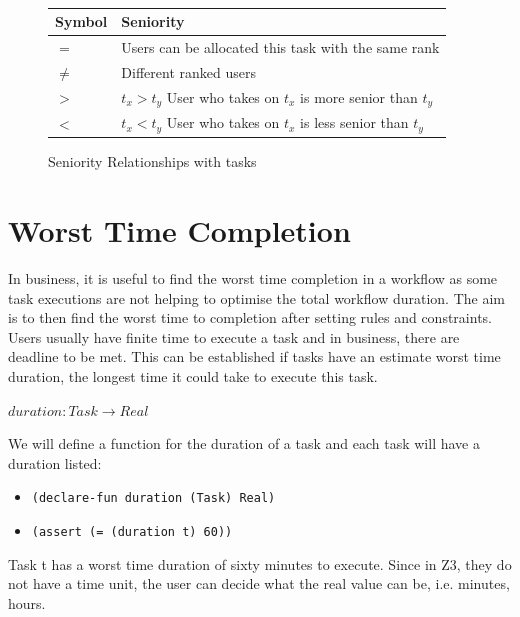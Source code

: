 \documentclass[a4paper]{report}
\begin{document}
\begin{figure}[!h]
\centering
{} \\
\begin{tabular}{ |l|l| }
\hline
Symbol & Seniority \\ \hline
$=$ & Users can be allocated this task with the same rank \\ \hline
$\neq$ & Different ranked users \\ \hline
$>$ & $t_x > t_y$ User who takes on $t_x$ is more senior than $t_y$ \\ \hline
$<$ & $t_x < t_y$ User who takes on $t_x$ is less senior than $t_y$ \\ 
\hline
\end{tabular}
\caption{Seniority Relationships with tasks}
\label{fig:Seniority Relationships with tasks}
\end{figure}

\section{Worst Time Completion}
In business, it is useful to find the worst time completion in a workflow as some task executions are not helping to optimise the total workflow duration. The aim is to then find the worst time to completion after setting rules and constraints. Users usually have finite time to execute a task and in business, there are deadline to be met. This can be established if tasks have an estimate worst time duration, the longest time it could take to execute this task. 
\begin{center}
$duration : Task \rightarrow Real$
\end{center}
We will define a function for the duration of a task and each task will have a duration listed:
\begin{itemize}
\item \texttt{(declare-fun duration (Task) Real)}
\item \texttt{(assert (= (duration t) 60))}
\end{itemize}
Task t has a worst time duration of sixty minutes to execute. Since in Z3, they do not have a time unit, the user can decide what the real value can be, i.e. minutes, hours.
\end{document}
